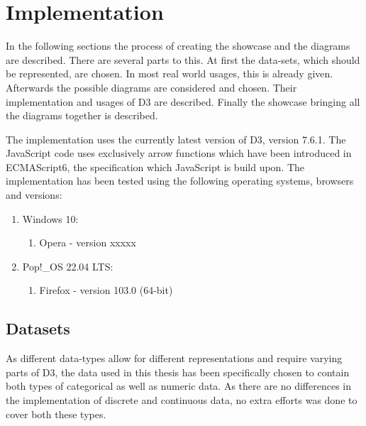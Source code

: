 \chapter{Implementation}


In the following sections the process of creating the showcase and the diagrams are described. There are several parts to this. At first the data-sets, which should be represented, are chosen. In most real world usages, this is already given. Afterwards the possible diagrams are considered and chosen. Their implementation and usages of D3 are described. Finally the showcase bringing all the diagrams together is described.

The implementation uses the currently latest version of D3, version 7.6.1. The JavaScript code uses exclusively arrow functions which have been introduced in ECMAScript6, the specification which JavaScript is build upon. The implementation has been tested using the following operating systems, browsers and versions:
\begin{enumerate}
    \item Windows 10:
    \begin{enumerate}
        \item Opera - version xxxxx
    \end{enumerate}
    \item Pop!\_OS 22.04 LTS:
    \begin{enumerate}
        \item Firefox - version 103.0 (64-bit)
    \end{enumerate}
\end{enumerate}

\section{Datasets}
As different data-types allow for different representations and require varying parts of D3, the data used in this thesis has been specifically chosen to contain both types of categorical as well as numeric data. As there are no differences in the implementation of discrete and continuous data, no extra efforts was done to cover both these types.

